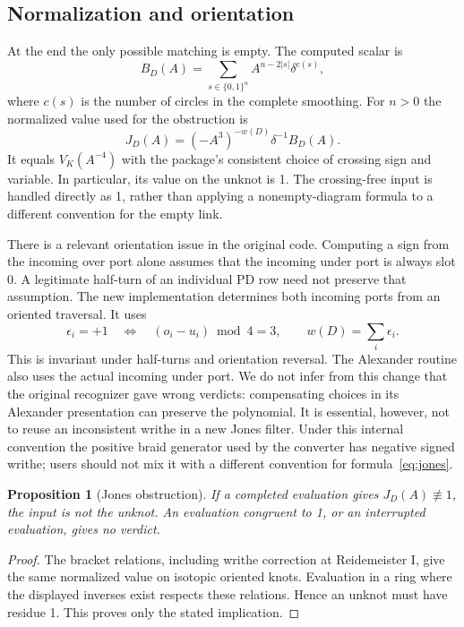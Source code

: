 \documentclass[11pt,letterpaper]{article}
\newtheorem{proposition}[theorem]{Proposition}
\theoremstyle{definition}
\begin{document}
\subsection{Normalization and orientation}

At the end the only possible matching is empty. The computed scalar is
\[
 B_D(A)=\sum_{s\in\{0,1\}^n} A^{n-2|s|}\delta^{c(s)},
\]
where $c(s)$ is the number of circles in the complete smoothing. For $n>0$ the
normalized value used for the obstruction is
\begin{equation}\label{eq:jones}
 J_D(A)=(-A^3)^{-w(D)}\delta^{-1} B_D(A).
\end{equation}
It equals $V_K(A^{-4})$ with the package's consistent choice of crossing sign
and variable. In particular, its value on the unknot is 1. The crossing-free
input is handled directly as 1, rather than applying a nonempty-diagram formula
to a different convention for the empty link.

There is a relevant orientation issue in the original code. Computing a sign
from the incoming over port alone assumes that the incoming under port is
always slot 0. A legitimate half-turn of an individual PD row need not preserve
that assumption. The new implementation determines both incoming ports from
an oriented traversal. It uses
\[
 \epsilon_i=+1\quad\Longleftrightarrow\quad
 (o_i-u_i)\bmod4=3,
 \qquad w(D)=\sum_i\epsilon_i.
\]
This is invariant under half-turns and orientation reversal. The Alexander
routine also uses the actual incoming under port. We do not infer from this
change that the original recognizer gave wrong verdicts: compensating choices
in its Alexander presentation can preserve the polynomial. It is essential,
however, not to reuse an inconsistent writhe in a new Jones filter. Under this
internal convention the positive braid generator used by the converter has
negative signed writhe; users should not mix it with a different convention for
formula~\eqref{eq:jones}.

\begin{proposition}[Jones obstruction]
If a completed evaluation gives $J_D(A)\not\equiv1$, the input is not the unknot.
An evaluation congruent to 1, or an interrupted evaluation, gives no verdict.
\end{proposition}
\begin{proof}
The bracket relations, including writhe correction at Reidemeister I, give the
same normalized value on isotopic oriented knots. Evaluation in a ring where
the displayed inverses exist respects these relations. Hence an unknot must
have residue 1. This proves only the stated implication.
\end{proof}
\end{document}
